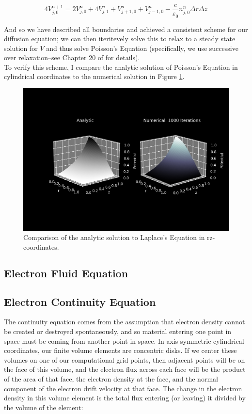 \documentclass[11pt]{article}
\begin{document}
\begin{equation}
    4V^{n+1}_{j,0} = 2V^{n}_{j,0} + 4V^n_{j,1} + V^n_{j+1,0} + V^n_{j-1,0}-\frac{e}{\varepsilon_0}n^n_{j,0}\Delta r \Delta z
\end{equation}

And so we have described all boundaries and achieved a consistent scheme for our diffusion equation; we can then iteritevely solve this to relax to a steady state solution for $V$ and thus solve Poisson's Equation (specifically, we use successive over relaxation–see Chapter 20 of \cite{numerical} for details). \\

To verify this scheme, I compare the analytic solution of Poisson's Equation in cylindrical coordinates to the numerical solution in Figure \ref{fig:analytic_laplace}.

\begin{figure}
    \centering
    \includegraphics[scale=0.2]{rz_analytic_numerical.png}
    \caption{Comparison of the analytic solution to Laplace's Equation in rz-coordinates.}
    \label{fig:analytic_laplace}
\end{figure}

\subsection{Electron Fluid Equation}

\subsection{Electron Continuity Equation}
The continuity equation comes from the assumption that electron density cannot be created or destroyed spontaneously, and so material entering one point in space must be coming from another point in space. In axis-symmetric cylindrical coordinates, our finite volume elements are concentric disks. If we center these volumes on one of our computational grid points, then adjacent points will be on the face of this volume, and the electron flux across each face will be the product of the area of that face, the electron density at the face, and the normal component of the electron drift velocity at that face. The change in the electron density in this volume element is the total flux entering (or leaving) it divided by the volume of the element:
\end{document}
